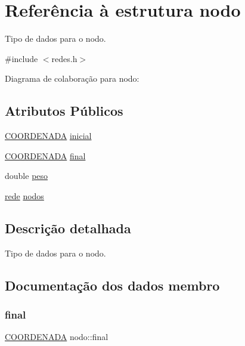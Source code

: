 \hypertarget{structnodo}{}\section{Referência à estrutura nodo}
\label{structnodo}


Tipo de dados para o nodo.  




{\ttfamily \#include $<$redes.\+h$>$}



Diagrama de colaboração para nodo\+:
\subsection*{Atributos Públicos}
\begin{DoxyCompactItemize}
\item 
\hyperlink{structCOORDENADA}{C\+O\+O\+R\+D\+E\+N\+A\+DA} \hyperlink{structnodo_a629a84853eaaade078b42b3a36a408e2}{inicial}
\item 
\hyperlink{structCOORDENADA}{C\+O\+O\+R\+D\+E\+N\+A\+DA} \hyperlink{structnodo_a8e90d00854c70f968c9c336592cabbb4}{final}
\item 
double \hyperlink{structnodo_ad9af03d4d3cfe325790568dc7a99e479}{peso}
\item 
\hyperlink{redes_8h_ae4343d882310b4cf47638a1465eadaed}{rede} \hyperlink{structnodo_a1cf8cb352c89ccfdb42abe37dd5ceede}{nodos}
\end{DoxyCompactItemize}


\subsection{Descrição detalhada}
Tipo de dados para o nodo. 

\subsection{Documentação dos dados membro}
\mbox{\label{structnodo_a8e90d00854c70f968c9c336592cabbb4}} 
\subsubsection{\texorpdfstring{final}{final}}
{\footnotesize\ttfamily \hyperlink{structCOORDENADA}{C\+O\+O\+R\+D\+E\+N\+A\+DA} nodo\+::final}

\mbox{\label{structnodo_a629a84853eaaade078b42b3a36a408e2}} 
